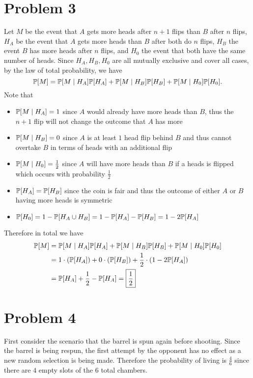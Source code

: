 \documentclass{eeleyes}
\begin{document}
\section*{Problem 3}
Let $M$ be the event that $A$ gets more heads after $n+1$ flips than $B$ after $n$ flips, $H_A$ be the event that $A$ gets more heads than $B$ after both do $n$ flips, $H_B$ the event $B$ has more heads after $n$ flips, and $H_0$ the event that both have the same number of heads. Since $H_A, H_B, H_0$ are all mutually exclusive and cover all cases, by the law of total probability, we have
\[
    \mathbb{P}\qty[M] = \mathbb{P}\qty[M \mid H_A] \mathbb{P}\qty[H_A] + \mathbb{P}\qty[M \mid H_B] \mathbb{P}\qty[H_B] + \mathbb{P}\qty[M \mid H_0] \mathbb{P}\qty[H_0]
.\]
Note that
\begin{itemize}
    \item $\mathbb{P}\qty[M \mid H_A] = 1$ since $A$ would already have more heads than $B$, thus the $n+1$ flip will not change the outcome that $A$ has more
    \item $\mathbb{P}\qty[M \mid H_B] = 0$ since $A$ is at least $1$ head flip behind $B$ and thus cannot overtake $B$ in terms of heads with an additional flip
    \item $\mathbb{P}\qty[M \mid H_0] = \frac{1}{2}$ since $A$ will have more heads than $B$ if a heads is flipped which occurs with probability $\frac{1}{2}$
    \item $\mathbb{P}\qty[H_A] = \mathbb{P}\qty[H_B]$ since the coin is fair and thus the outcome of either $A$ or $B$ having more heads is symmetric
    \item $\mathbb{P}\qty[H_0] = 1 - \mathbb{P}\qty[H_A \cup H_B] = 1 - \mathbb{P}\qty[H_A] - \mathbb{P}\qty[H_B] = 1 - 2 \mathbb{P}\qty[H_A]$
\end{itemize}
Therefore in total we have
\begin{align*}
    \mathbb{P}\qty[M] &= \mathbb{P}\qty[M \mid H_A] \mathbb{P}\qty[H_A] + \mathbb{P}\qty[M \mid H_B] \mathbb{P}\qty[H_B] + \mathbb{P}\qty[M \mid H_0] \mathbb{P}\qty[H_0] \\
             &= 1\cdot(\mathbb{P}\qty[H_A]) + 0 \cdot(\mathbb{P}\qty[H_B]) + \frac{1}{2} \cdot (1 - 2\mathbb{P}\qty[H_A]) \\
             &= \mathbb{P}\qty[H_A] + \frac{1}{2} - \mathbb{P}\qty[H_A] = \boxed{\frac{1}{2}}
\end{align*}

\section*{Problem 4}
First consider the scenario that the barrel is spun again before shooting. Since the barrel is being respun, the first attempt by the opponent has no effect as a new random selection is being made. Therefore the probability of living is $\frac{4}{6}$ since there are $4$ empty slots of the $6$ total chambers.
\end{document}
